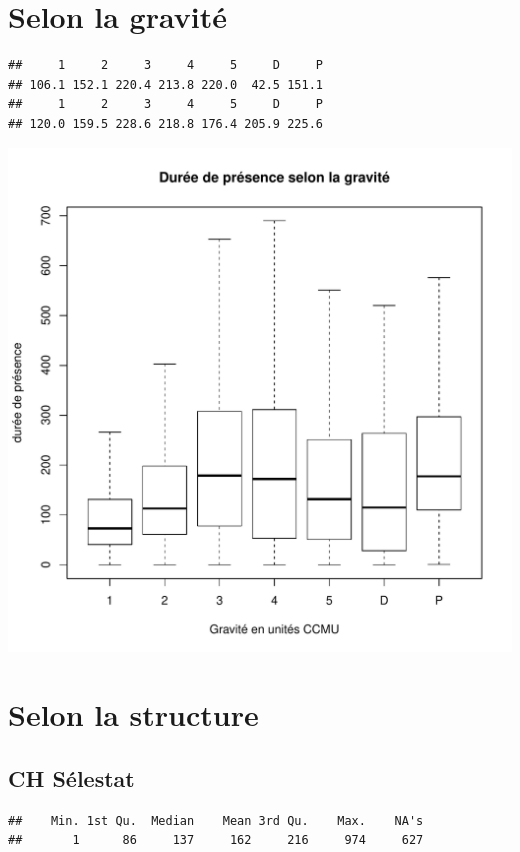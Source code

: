 \documentclass[12pt,english,french,twoside]{report}\usepackage[]{graphicx}\usepackage[]{color}
\makeatletter
\def\maxwidth{ %
  \ifdim\Gin@nat@width>\linewidth
    \linewidth
  \else
    \Gin@nat@width
  \fi
}
\newenvironment{kframe}{%
 \def\at@end@of@kframe{}%
 \ifinner\ifhmode%
  \def\at@end@of@kframe{\end{minipage}}%
  \begin{minipage}{\columnwidth}%
 \fi\fi%
 \def\FrameCommand##1{\hskip\@totalleftmargin \hskip-\fboxsep
 \colorbox{shadecolor}{##1}\hskip-\fboxsep
     \hskip-\linewidth \hskip-\@totalleftmargin \hskip\columnwidth}%
 \MakeFramed {\advance\hsize-\width
   \@totalleftmargin\z@ \linewidth\hsize
   \@setminipage}}%
 {\par\unskip\endMakeFramed%
 \at@end@of@kframe}
\newenvironment{knitrout}{}{} %
\makeatother
\begin{document}
\section*{Selon la gravité}
\begin{knitrout}
\color{fgcolor}\begin{kframe}
\begin{verbatim}
##     1     2     3     4     5     D     P 
## 106.1 152.1 220.4 213.8 220.0  42.5 151.1
##     1     2     3     4     5     D     P 
## 120.0 159.5 228.6 218.8 176.4 205.9 225.6
\end{verbatim}
\end{kframe}
\includegraphics[width=\maxwidth]{figure/duree_gravite} 

\end{knitrout}


\section*{Selon la structure}
\subsection{CH Sélestat}
\begin{knitrout}
\color{fgcolor}\begin{kframe}
\begin{verbatim}
##    Min. 1st Qu.  Median    Mean 3rd Qu.    Max.    NA's 
##       1      86     137     162     216     974     627
\end{verbatim}
\end{kframe}
\end{knitrout}
\end{document}
